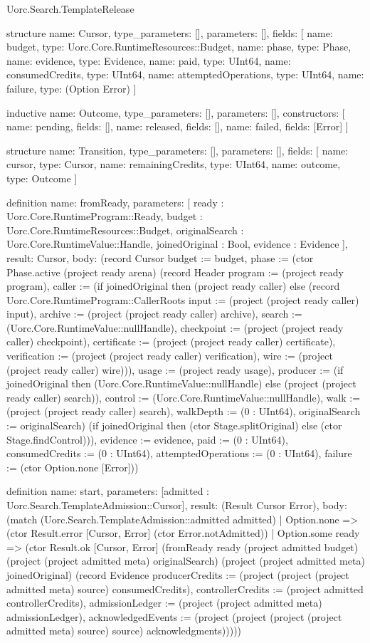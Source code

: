 \begin{lexlean}{Uorc.Search.TemplateRelease}
\begin{semanticmodule}
structure{
  name: Cursor,
  type_parameters: [],
  parameters: [],
  fields: [
    {name: budget, type: Uorc.Core.RuntimeResources::Budget},
    {name: phase, type: Phase},
    {name: evidence, type: Evidence},
    {name: paid, type: UInt64},
    {name: consumedCredits, type: UInt64},
    {name: attemptedOperations, type: UInt64},
    {name: failure, type: (Option Error)}
  ]
}

inductive{
  name: Outcome,
  type_parameters: [],
  parameters: [],
  constructors: [
    {name: pending, fields: []},
    {name: released, fields: []},
    {name: failed, fields: [Error]}
  ]
}

structure{
  name: Transition,
  type_parameters: [],
  parameters: [],
  fields: [
    {name: cursor, type: Cursor},
    {name: remainingCredits, type: UInt64},
    {name: outcome, type: Outcome}
  ]
}

definition{
  name: fromReady,
  parameters: [
    ready : Uorc.Core.RuntimeProgram::Ready,
    budget : Uorc.Core.RuntimeResources::Budget,
    originalSearch : Uorc.Core.RuntimeValue::Handle,
    joinedOriginal : Bool,
    evidence : Evidence
  ],
  result: Cursor,
  body: (record Cursor {budget := budget, phase := (ctor Phase.active (project ready arena) (record Header {program := (project ready program), caller := (if joinedOriginal then (project ready caller) else (record Uorc.Core.RuntimeProgram::CallerRoots {input := (project (project ready caller) input), archive := (project (project ready caller) archive), search := (Uorc.Core.RuntimeValue::nullHandle), checkpoint := (project (project ready caller) checkpoint), certificate := (project (project ready caller) certificate), verification := (project (project ready caller) verification), wire := (project (project ready caller) wire)})), usage := (project ready usage), producer := (if joinedOriginal then (Uorc.Core.RuntimeValue::nullHandle) else (project (project ready caller) search)), control := (Uorc.Core.RuntimeValue::nullHandle), walk := (project (project ready caller) search), walkDepth := (0 : UInt64), originalSearch := originalSearch}) (if joinedOriginal then (ctor Stage.splitOriginal) else (ctor Stage.findControl))), evidence := evidence, paid := (0 : UInt64), consumedCredits := (0 : UInt64), attemptedOperations := (0 : UInt64), failure := (ctor Option.none [Error])})
}

definition{
  name: start,
  parameters: [admitted : Uorc.Search.TemplateAdmission::Cursor],
  result: (Result Cursor Error),
  body: (match (Uorc.Search.TemplateAdmission::admitted admitted)
    | Option.none => (ctor Result.error [Cursor, Error] (ctor Error.notAdmitted))
    | Option.some ready => (ctor Result.ok [Cursor, Error] (fromReady ready (project admitted budget) (project (project admitted meta) originalSearch) (project (project admitted meta) joinedOriginal) (record Evidence {producerCredits := (project (project (project admitted meta) source) consumedCredits), controllerCredits := (project admitted controllerCredits), admissionLedger := (project (project admitted meta) admissionLedger), acknowledgedEvents := (project (project (project (project admitted meta) source) source) acknowledgments)}))))
}


\end{semanticmodule}
\end{lexlean}

